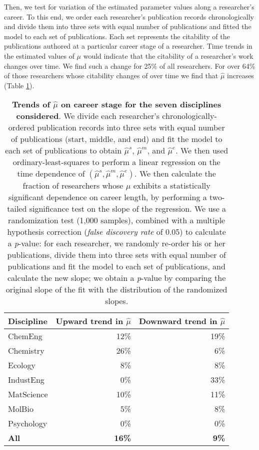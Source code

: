 Then, we test for variation of the estimated parameter values along a researcher's career. To this end, we order each researcher's publication records chronologically and divide them into three sets with equal number of publications and fitted the model to each set of publications. Each set represents the citability of the publications authored at a particular career stage of a researcher. Time trends in the estimated values of $\mu$ would indicate that the citability of a researcher's work changes over time. We find such a change for 25\% of all researchers. For over 64\% of those researchers whose citability changes of over time we find that $\hat{\mu}$ increases (Table \ref{table:lognormal:mu-trends}).

\begin{table}[t]
\caption[Trends of $\hat{\mu}$ on career stage for the seven disciplines considered.]{\textbf{Trends of $\hat{\mu}$ on career stage for the seven disciplines considered}. We divide each researcher's chronologically-ordered publication records into three sets with equal number of publications (start, middle, and end) and fit the model to each set of publications to obtain $\hat{\mu}^s$, $\hat{\mu}^m$, and $\hat{\mu}^e$. We then used ordinary-least-squares to perform a linear regression on the time dependence of $(\hat{\mu}^s, \hat{\mu}^m, \hat{\mu}^e)$. We then calculate the fraction of researchers whose $\mu$ exhibits a statistically significant dependence on career length, by performing a two-tailed significance test on the slope of the regression. We use a randomization test (1,000 samples), combined with a multiple hypothesis correction \cite{Benjamini1995} (\emph{false discovery rate} of 0.05) to calculate a \textit{p}-value: for each researcher, we randomly re-order his or her publications, divide them into three sets with equal number of publications and fit the model to each set of publications, and calculate the new slope; we obtain a \textit{p}-value by comparing the original slope of the fit with the distribution of the randomized slopes.}
\label{table:lognormal:mu-trends}
\begin{tabular}{lrr}
\textbf{Discipline} & \textbf{Upward trend in $\hat{\mu}$} & \textbf{Downward trend in $\hat{\mu}$} \\ \midrule
ChemEng & 12\% & 19\% \\
Chemistry & 26\% & 6\% \\
Ecology & 8\% & 8\% \\
IndustEng & 0\% & 33\% \\
MatScience & 10\% & 11\% \\
MolBio & 5\% & 8\% \\
Psychology & 0\% & 0\% \\ \midrule
\textbf{All} & \textbf{16\%} & \textbf{9\%} \\
\end{tabular}
\end{table}

